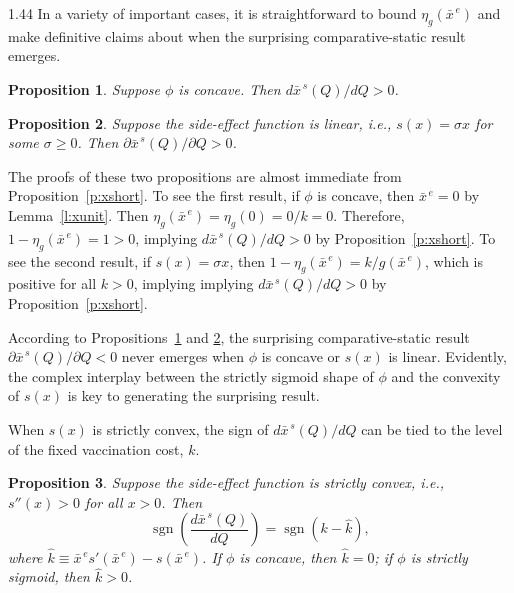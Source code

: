 \documentclass[12pt]{article}
\DeclareMathOperator*{\sgn}{sgn}
\newcommand{\efficacy}{\phi}
\newcommand{\side}{s}
\newcommand{\general}{g}
\newcommand{\xshortbar}{\bar{x}^{\,s}}
\newcommand{\xunitbar}{\bar{x}^{\,e}}
\newcommand{\elasticity}[1]{\eta_{#1}}
\newtheorem{proposition}{Proposition}
\begin{document}
\begin{spacing}{1.44}
In a variety of important cases, it is straightforward to bound
$\elasticity{\general}\!(\xunitbar)$ and make definitive claims about
when the surprising comparative-static result emerges.
\begin{proposition}
\label{p:concave}
\singlespace
Suppose $\efficacy$ is concave. Then $d \xshortbar\!(Q) /
d Q > 0$.
\end{proposition}

\begin{proposition}
\label{p:linear}
\singlespace
Suppose the side-effect function is linear, i.e., $\side(x) = \sigma
x$ for some $\sigma \geq 0$. Then $\partial \xshortbar\!(Q) / \partial
Q > 0$.
\end{proposition}

\noindent The proofs of these two propositions are almost immediate
from Proposition~\ref{p:xshort}. To see the first result, if
$\efficacy$ is concave, then $\xunitbar = 0$ by
Lemma~\ref{l:xunit}. Then $\elasticity{\general}\!(\xunitbar) =
\elasticity{\general}\!(0) = 0 / k = 0$. Therefore, $1 -
\elasticity{\general}\!(\xunitbar) = 1 > 0$, implying $d
\xshortbar\!(Q) / d Q > 0$ by Proposition~\ref{p:xshort}. To see the
second result, if $\side(x) = \sigma x$, then $1 -
\elasticity{\general}\!(\xunitbar) = k / \general(\xunitbar)$, which
is positive for all $k > 0$, implying implying $d \xshortbar\!(Q) / d
Q > 0$ by Proposition~\ref{p:xshort}.

According to Propositions~\ref{p:concave} and \ref{p:linear}, the
surprising comparative-static result $\partial \xshortbar\!(Q) /
\partial Q < 0$ never emerges when $\efficacy$ is concave or
$\side(x)$ is linear. Evidently, the complex interplay between the
strictly sigmoid shape of $\efficacy$ and the convexity of $\side(x)$
is key to generating the surprising result.

When $\side(x)$ is strictly convex, the sign of $d
\xshortbar\!(Q) / d Q$ can be tied to the level of the fixed
vaccination cost, $k$.
\begin{proposition}
\label{p:k}
\singlespace
Suppose the side-effect function is strictly convex, i.e., $\side''(x)
> 0$ for all $x > 0$. Then
\begin{equation}
\label{sign_k}
\sgn \left( \frac{d \xshortbar\!(Q)}{d Q} \right) = \sgn
(k - \hat{k}),
\end{equation}
where $\hat{k} \equiv \xunitbar \side'(\xunitbar) -
\side(\xunitbar)$. If $\efficacy$ is concave, then $\hat{k} = 0$; if
$\efficacy$ is strictly sigmoid, then $\hat{k} > 0$.
\end{proposition}


\end{spacing}
\end{document}
